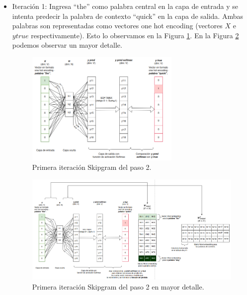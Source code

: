 \documentclass[12pt,a4paper]{article}
\begin{document}
\begin{sloppypar}
\begin{enumerate}
\begin{itemize}
      \item Iteración 1: Ingresa “the” como palabra central en la capa de entrada y se intenta predecir la palabra de contexto “quick” en la capa de salida. Ambas palabras son representadas como vectores one hot encoding (vectores $X$ e $y true$ respectivamente). Esto lo observamos en la Figura \ref{fig:5_EjSkip}. En la Figura \ref{fig:6_EjSkip} podemos observar un mayor detalle. 

\begin{figure}[H]    %
\centering
\includegraphics[width=0.7\textwidth]{images/Ejemplo_Skipgram/5_EjSkip.png}
\caption{Primera iteración Skipgram del paso 2.} 
\label{fig:5_EjSkip}
\end{figure}

\begin{figure}[H]    %
\centering
\includegraphics[width=1\textwidth]{images/Ejemplo_Skipgram/6_EjSkip.png}
 \captionsetup{justification=centering,margin=3.5cm}
\caption{Primera iteración Skipgram del paso 2 en mayor detalle.} 
\label{fig:6_EjSkip}
\end{figure}


\end{itemize}
\end{enumerate}
\end{sloppypar}
\end{document}
